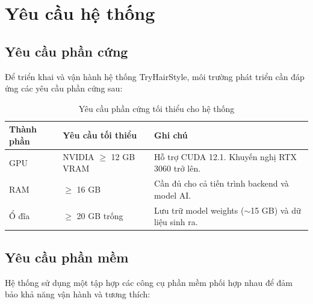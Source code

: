 \documentclass[../main.tex]{subfiles}
\begin{document}
\section{Yêu cầu hệ thống}

\subsection{Yêu cầu phần cứng}
Để triển khai và vận hành hệ thống TryHairStyle, môi trường phát triển cần đáp ứng các yêu cầu phần cứng sau:

\begin{table}[H]
    \centering
    \caption{Yêu cầu phần cứng tối thiểu cho hệ thống}
    \label{tab:hw-requirements}
    \begin{tabularx}{\textwidth}{|>{\raggedright\arraybackslash}p{3.5cm}|>{\raggedright\arraybackslash}p{4cm}|X|}
        \hline
        \textbf{Thành phần} & \textbf{Yêu cầu tối thiểu} & \textbf{Ghi chú} \\
        \hline
        GPU & NVIDIA $\geq$ 12 GB VRAM & Hỗ trợ CUDA 12.1. Khuyến nghị RTX 3060 trở lên. \\
        \hline
        RAM & $\geq$ 16 GB & Cần đủ cho cả tiến trình backend và model AI. \\
        \hline
        Ổ đĩa & $\geq$ 20 GB trống & Lưu trữ model weights ($\sim$15 GB) và dữ liệu sinh ra. \\
        \hline
    \end{tabularx}
\end{table}

\subsection{Yêu cầu phần mềm}
Hệ thống sử dụng một tập hợp các công cụ phần mềm phối hợp nhau để đảm bảo khả năng vận hành và tương thích:
\end{document}
